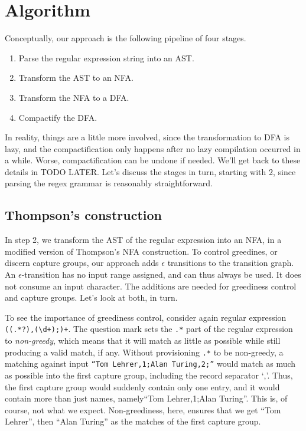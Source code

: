 \documentclass[english]{sigplanconf}
\theoremstyle{definition}
\begin{document}
\section{Algorithm}

Conceptually, our approach is the following pipeline of four stages.
\begin{enumerate}
  \item Parse the regular expression string into an AST.
  \item Transform the AST to an NFA.
  \item Transform the NFA to a DFA.
  \item Compactify the DFA.
\end{enumerate}

In reality, things are a little more involved, since the
transformation to DFA is lazy, and the compactification only happens
after no lazy compilation occurred in a while. Worse, compactification
can be undone if needed. We'll get back to these details in TODO
LATER. Let's discuss the stages in turn, starting with 2, since
parsing the regex grammar is reasonably straightforward.

\subsection{Thompson's construction} 

In step 2, we transform the AST of the regular expression into an NFA,
in a modified version of Thompson's NFA construction. To
control greedines, or discern capture groups, our approach adds
$\epsilon$ transitions to the transition graph. An
$\epsilon$-transition has no input range assigned, and can thus always
be used. It does not consume an input character.
The additions are needed for greediness control and capture groups.
Let's look at both, in turn.

To see the importance of greediness control, consider again regular
expression \texttt{((.*?),(\textbackslash{}d+);)+}. The question
mark sets the \texttt{.*} part of the regular expression to
\emph{non-greedy}, which means that it will match as little as
possible while still producing a valid match, if any.  Without
provisioning \texttt{.*} to be non-greedy, a matching against input
\texttt{``Tom Lehrer,1;Alan Turing,2;''} would match as much as
possible into the first capture group, including the record separator
`,'.  Thus, the first capture group would suddenly contain only one
entry, and it would contain more than just names, namely``Tom
Lehrer,1;Alan Turing''.  This is, of course, not what we expect.
Non-greediness, here, ensures that we get ``Tom Lehrer'', then
``Alan Turing'' as the matches of the first capture group.
\end{document}
